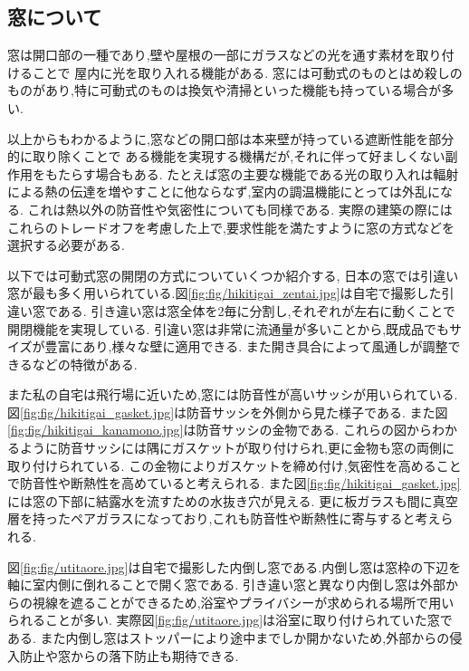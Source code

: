 \subsection*{窓について}
窓は開口部の一種であり,壁や屋根の一部にガラスなどの光を通す素材を取り付けることで
屋内に光を取り入れる機能がある.
窓には可動式のものとはめ殺しのものがあり,特に可動式のものは換気や清掃といった機能も持っている場合が多い.

以上からもわかるように,窓などの開口部は本来壁が持っている遮断性能を部分的に取り除くことで
ある機能を実現する機構だが,それに伴って好ましくない副作用をもたらす場合もある.
たとえば窓の主要な機能である光の取り入れは輻射による熱の伝達を増やすことに他ならなず,室内の調温機能にとっては外乱になる.
これは熱以外の防音性や気密性についても同様である.
実際の建築の際にはこれらのトレードオフを考慮した上で,要求性能を満たすように窓の方式などを選択する必要がある.

以下では可動式窓の開閉の方式についていくつか紹介する,
日本の窓では引違い窓が最も多く用いられている.\cite{mado:online}図\ref{fig:fig/hikitigai_zentai.jpg}は自宅で撮影した引違い窓である.
引き違い窓は窓全体を2毎に分割し,それぞれが左右に動くことで開閉機能を実現している.
引違い窓は非常に流通量が多いことから,既成品でもサイズが豊富にあり,様々な壁に適用できる.
また開き具合によって風通しが調整できるなどの特徴がある.

また私の自宅は飛行場に近いため,窓には防音性が高いサッシが用いられている.
図\ref{fig:fig/hikitigai_gasket.jpg}は防音サッシを外側から見た様子である.
また図\ref{fig:fig/hikitigai_kanamono.jpg}は防音サッシの金物である.
これらの図からわかるように防音サッシには隅にガスケットが取り付けられ,更に金物も窓の両側に取り付けられている.
この金物によりガスケットを締め付け,気密性を高めることで防音性や断熱性を高めていると考えられる.
また図\ref{fig:fig/hikitigai_gasket.jpg}には窓の下部に結露水を流すための水抜き穴が見える.
更に板ガラスも間に真空層を持ったペアガラスになっており,これも防音性や断熱性に寄与すると考えられる.

図\ref{fig:fig/utitaore.jpg}は自宅で撮影した内倒し窓である.内倒し窓は窓枠の下辺を軸に室内側に倒れることで開く窓である.
引き違い窓と異なり内倒し窓は外部からの視線を遮ることができるため,浴室やプライバシーが求められる場所で用いられることが多い.\cite{mado:online}
実際図\ref{fig:fig/utitaore.jpg}は浴室に取り付けられていた窓である.
また内倒し窓はストッパーにより途中までしか開かないため,外部からの侵入防止や窓からの落下防止も期待できる.\cite{utitaosi:online}
